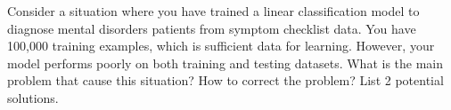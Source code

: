 Consider a situation where you have trained a linear classification model to diagnose mental disorders patients from symptom checklist data. You have 100,000 training examples, which is sufficient data for learning. However, your model performs poorly on both training and testing datasets. What is the main problem that cause this situation? How to correct the problem? List 2 potential solutions.
